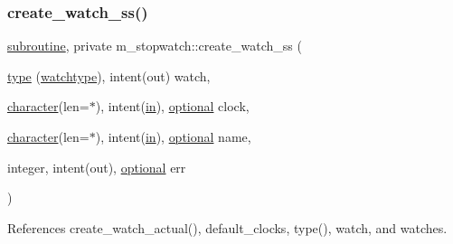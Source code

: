 \subsubsection{\texorpdfstring{create\+\_\+watch\+\_\+ss()}{create\_watch\_ss()}}
{\footnotesize\ttfamily \hyperlink{M__stopwatch_83_8txt_acfbcff50169d691ff02d4a123ed70482}{subroutine}, private m\+\_\+stopwatch\+::create\+\_\+watch\+\_\+ss (\begin{DoxyParamCaption}\item[{\hyperlink{stop__watch_83_8txt_a70f0ead91c32e25323c03265aa302c1c}{type} (\hyperlink{structm__stopwatch_1_1watchtype}{watchtype}), intent(out)}]{watch,  }\item[{\hyperlink{option__stopwatch_83_8txt_abd4b21fbbd175834027b5224bfe97e66}{character}(len=$\ast$), intent(\hyperlink{M__journal_83_8txt_afce72651d1eed785a2132bee863b2f38}{in}), \hyperlink{option__stopwatch_83_8txt_aa4ece75e7acf58a4843f70fe18c3ade5}{optional}}]{clock,  }\item[{\hyperlink{option__stopwatch_83_8txt_abd4b21fbbd175834027b5224bfe97e66}{character}(len=$\ast$), intent(\hyperlink{M__journal_83_8txt_afce72651d1eed785a2132bee863b2f38}{in}), \hyperlink{option__stopwatch_83_8txt_aa4ece75e7acf58a4843f70fe18c3ade5}{optional}}]{name,  }\item[{integer, intent(out), \hyperlink{option__stopwatch_83_8txt_aa4ece75e7acf58a4843f70fe18c3ade5}{optional}}]{err }\end{DoxyParamCaption})\hspace{0.3cm}{\ttfamily [private]}}



References create\+\_\+watch\+\_\+actual(), default\+\_\+clocks, type(), watch, and watches.

\mbox{\label{namespacem__stopwatch_a67e6ae5ff7326a3b3f9effc4e4fff281}} 

